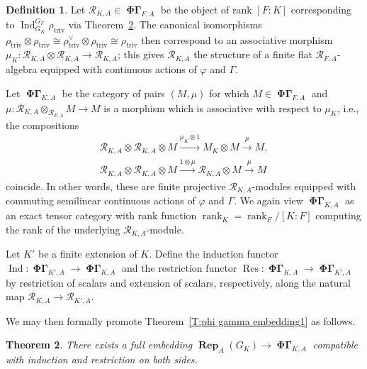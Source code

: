 \documentclass[12pt]{amsart}
\newtheorem{theorem}{Theorem}[section]
\theoremstyle{definition}
\newtheorem{defn}[theorem]{Definition}
\numberwithin{equation}{theorem}
\newcommand{\calR}{\mathcal{R}}
\newcommand{\dual}{\vee}
\DeclareMathOperator{\Ind}{Ind}
\DeclareMathOperator{\PhiGamma}{\mathbf{\Phi \Gamma}}
\DeclareMathOperator{\rank}{rank}
\DeclareMathOperator{\Rep}{\mathbf{Rep}}
\DeclareMathOperator{\Res}{Res}
\DeclareMathOperator{\triv}{triv}
\begin{document}
\begin{defn}
Let $\calR_{K,A} \in \PhiGamma_{F,A}$ be the object of rank $[F:K]$ corresponding to $\Ind^{G_F}_{G_K} \rho_{\triv}$ via Theorem~\ref{T:phi gamma embedding}. The canonical isomorphisms $\rho_{\triv} \otimes \rho_{\triv} \cong \rho_{\triv}^\dual \otimes \rho_{\triv} \cong \rho_{\triv}$
then correspond to an associative morphism $\mu_K: \calR_{K,A} \otimes \calR_{K,A} \to \calR_{K,A}$; this gives $\calR_{K,A}$ the structure of a finite flat $\calR_{F,A}$-algebra equipped with continuous actions of $\varphi$ and $\Gamma$.

Let $\PhiGamma_{K,A}$ be the category of pairs $(M, \mu)$ for which $M \in \PhiGamma_{F,A}$
and $\mu: \calR_{K,A} \otimes_{\calR_{F,A}} M \to M$ is a morphism which is associative with respect to $\mu_K$, i.e., the compositions
\begin{gather*}
\calR_{K,A} \otimes \calR_{K,A}  \otimes M \stackrel{\mu_K \otimes 1}{\to} M_K \otimes M \stackrel{\mu}{\to} M, \\
\calR_{K,A} \otimes \calR_{K,A} \otimes M \stackrel{1 \otimes \mu}{\to} \calR_{K,A} \otimes  M \stackrel{\mu}{\to} M
\end{gather*}
coincide. 
In other words, these are finite projective $\calR_{K,A}$-modules equipped with commuting semilinear continuous actions of $\varphi$ and $\Gamma$.
We again view $\PhiGamma_{K,A}$ as an exact tensor category with rank function $\rank_K = \rank_F / [K:F]$ computing the rank of the underlying $\calR_{K,A}$-module.

Let $K'$ be a finite extension of $K$. Define the induction functor
$\Ind: \PhiGamma_{K',A} \to \PhiGamma_{K,A}$ 
and the restriction functor $\Res: \PhiGamma_{K,A} \to \PhiGamma_{K',A}$
by restriction of scalars and extension of scalars, respectively, along the natural map $\calR_{K,A}  \to \calR_{K',A}$.
\end{defn}

We may then formally promote Theorem~\ref{T:phi gamma embedding1} as follows.
\begin{theorem} \label{T:phi gamma embedding}
There exists a full embedding $\Rep_A(G_K) \to \PhiGamma_{K,A}$ compatible with induction and restriction on both sides.
\end{theorem}
\end{document}
